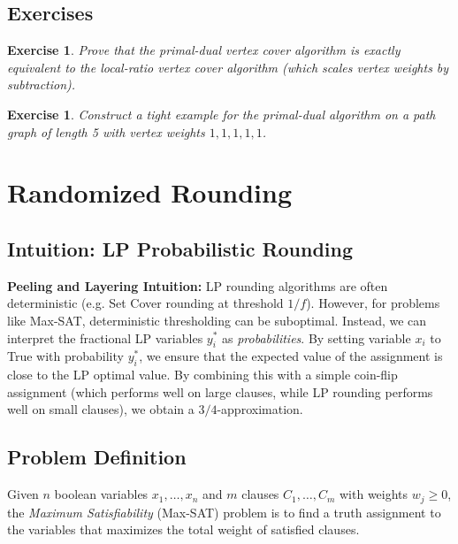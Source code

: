 \documentclass[11pt,oneside]{book}
\newtheorem{exercise}[theorem]{Exercise}
\begin{document}
\section{Exercises}
\begin{exercise}
Prove that the primal-dual vertex cover algorithm is exactly equivalent to the local-ratio vertex cover algorithm (which scales vertex weights by subtraction).
\end{exercise}
\begin{exercise}
Construct a tight example for the primal-dual algorithm on a path graph of length 5 with vertex weights $1, 1, 1, 1, 1$.
\end{exercise}

\setcounter{chapter}{15}
\chapter{Randomized Rounding}
\label{ch:randomized_rounding}

\section{Intuition: LP Probabilistic Rounding}

\begin{intuitionbox}
\textbf{Peeling and Layering Intuition:} LP rounding algorithms are often deterministic (e.g. Set Cover rounding at threshold $1/f$). However, for problems like Max-SAT, deterministic thresholding can be suboptimal. Instead, we can interpret the fractional LP variables $y_i^*$ as \emph{probabilities}. By setting variable $x_i$ to True with probability $y_i^*$, we ensure that the expected value of the assignment is close to the LP optimal value. By combining this with a simple coin-flip assignment (which performs well on large clauses, while LP rounding performs well on small clauses), we obtain a $3/4$-approximation.
\end{intuitionbox}

\section{Problem Definition}
Given $n$ boolean variables $x_1, \dots, x_n$ and $m$ clauses $C_1, \dots, C_m$ with weights $w_j \ge 0$, the \emph{Maximum Satisfiability} (Max-SAT) problem is to find a truth assignment to the variables that maximizes the total weight of satisfied clauses.
\end{document}
